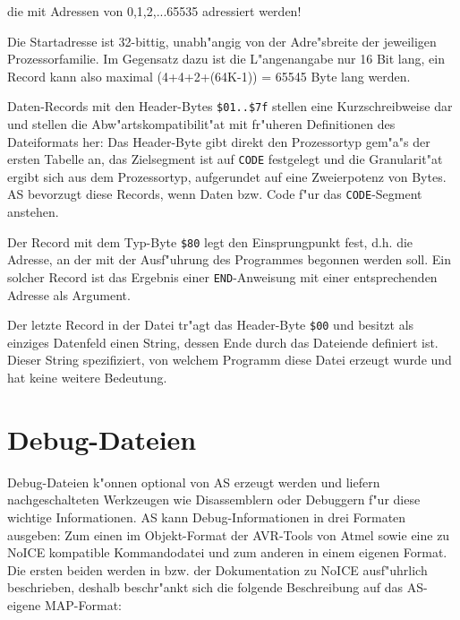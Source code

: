 \documentclass[12pt,a4paper,twoside]{report}
\newcommand{\tty}[1]{{\tt #1}}
\begin{document}
die mit Adressen von 0,1,2,...65535 adressiert werden!
\par
Die Startadresse ist 32-bittig, unabh"angig von der Adre"sbreite der
jeweiligen Prozessorfamilie.  Im Gegensatz dazu ist die L"angenangabe
nur 16 Bit lang, ein Record kann also maximal (4+4+2+(64K-1)) = 65545
Byte lang werden.
\par
Daten-Records mit den Header-Bytes \verb!$01..$7f! stellen eine
Kurzschreibweise dar und stellen die Abw"artskompatibilit"at mit fr"uheren
Definitionen des Dateiformats her: Das Header-Byte gibt direkt den
Prozessortyp gem"a"s der ersten Tabelle an, das Zielsegment ist auf \tty{CODE}
festgelegt und die Granularit"at ergibt sich aus dem Prozessortyp,
aufgerundet auf eine Zweierpotenz von Bytes.  AS bevorzugt diese Records,
wenn Daten bzw. Code f"ur das \tty{CODE}-Segment anstehen.
\par
Der Record mit dem Typ-Byte \verb!$80! legt den Einsprungpunkt fest, d.h.
die Adresse, an der mit der Ausf"uhrung des Programmes begonnen werden
soll.  Ein solcher Record ist das Ergebnis einer \tty{END}-Anweisung mit
einer entsprechenden Adresse als Argument.
\par
Der letzte Record in der Datei tr"agt das Header-Byte \verb!$00! und besitzt
als einziges Datenfeld einen String, dessen Ende durch das Dateiende
definiert ist.  Dieser String spezifiziert, von welchem Programm diese
Datei erzeugt wurde und hat keine weitere Bedeutung.


\section{Debug-Dateien}\label{SectDebugFormat}

Debug-Dateien k"onnen optional von AS erzeugt werden und liefern
nachgeschalteten Werkzeugen wie Disassemblern oder Debuggern f"ur diese
wichtige Informationen.  AS kann Debug-Informationen in drei Formaten
ausgeben: Zum einen im Objekt-Format der AVR-Tools von Atmel sowie eine zu
NoICE kompatible Kommandodatei und zum anderen in einem eigenen Format.
Die ersten beiden werden in \cite{AVRObj} bzw. der Dokumentation zu
NoICE ausf"uhrlich beschrieben, deshalb beschr"ankt sich die folgende
Beschreibung auf das AS-eigene MAP-Format:
\end{document}

